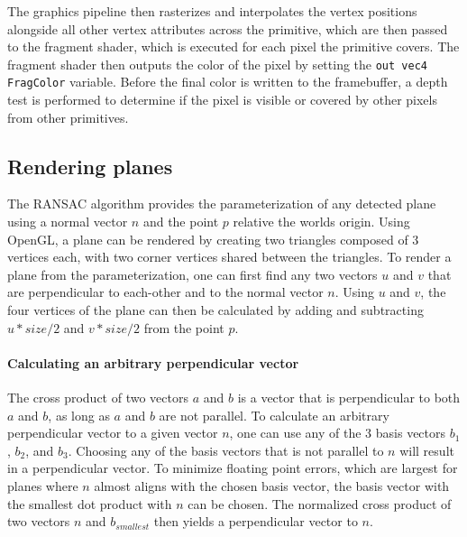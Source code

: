 The graphics pipeline then rasterizes and interpolates the vertex positions alongside all other vertex attributes
across the primitive, which are then passed to the fragment shader, which is executed for each pixel the primitive covers.
The fragment shader then outputs the color of the pixel by setting the \texttt{out vec4 FragColor} variable.
Before the final color is written to the framebuffer,
a depth test is performed to determine if the pixel is visible or covered by other pixels from other primitives.

\subsection{Rendering planes}
The RANSAC algorithm provides the parameterization of any detected plane using a normal vector $n$ and the point $p$ relative the worlds origin.
Using OpenGL, a plane can be rendered by creating two triangles composed of 3 vertices each, with two corner vertices shared between the triangles.
To render a plane from the parameterization, one can first find any two vectors $u$ and $v$
that are perpendicular to each-other and to the normal vector $n$.
Using $u$ and $v$, the four vertices of the plane can then be calculated by adding and subtracting $u * size / 2$ and $v * size / 2$ from the point $p$.

\paragraph{Calculating an arbitrary perpendicular vector}
The cross product of two vectors $a$ and $b$ is a vector that is perpendicular to both $a$ and $b$,
as long as $a$ and $b$ are not parallel.
To calculate an arbitrary perpendicular vector to a given vector $n$, one can use any of the 3 basis vectors ${b_1}$, ${b_2}$, and ${b_3}$.
Choosing any of the basis vectors that is not parallel to $n$ will result in a perpendicular vector.
To minimize floating point errors, which are largest for planes where $n$ almost aligns with the chosen basis vector,
the basis vector with the smallest dot product with $n$ can be chosen.
The normalized cross product of two vectors $n$ and $b_{smallest}$ then yields a perpendicular vector to $n$.

